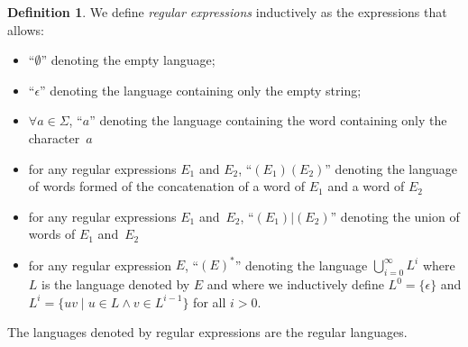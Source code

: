 \documentclass[12px]{article}
\theoremstyle{definition}
\newtheorem{definition}{Definition}
\begin{document}
        \begin{definition}%
          \label{def:regex}
          We define \emph{regular expressions} inductively as the expressions
          that allows:
            \begin{itemize}
              \item ``$\emptyset$'' denoting the empty language;
              \item ``$\epsilon$'' denoting the language containing only the
                empty string;
              \item $\forall a \in \Sigma$, ``$a$'' denoting the language
                containing the word containing only the character~$a$
              \item for any regular expressions $E_1$ and $E_2$, ``$(E_1)
                (E_2)$'' denoting the language of words formed of the
                concatenation of a word of $E_1$ and a word of $E_2$
              \item for any regular expressions $E_1$ and~$E_2$,
                ``$(E_1)|(E_2)$'' denoting the union of words of $E_1$
                and~$E_2$
              \item for any regular expression $E$, ``${(E)}^*$'' denoting the
                language $\bigcup_{i = 0}^\infty L^i$ where $L$ is the
                language denoted by $E$ and where we inductively define $L^0 =
                \{\epsilon\}$ and $L^i = \{uv \mid u \in L \land v \in
                L^{i-1}\}$ for all $i > 0$.
            \end{itemize}

          The languages denoted by regular expressions are the regular
          languages.

        \end{definition}
\end{document}

